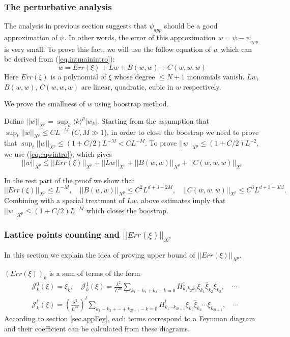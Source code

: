 \subsubsection{The perturbative analysis}\label{sec.pert intro} The analysis in previous section suggests that $\psi_{app}$ should be a good approximation of $\psi$. In other words, the error of this approximation $w=\psi-\psi_{app}$ is very small. To prove this fact, we will use the follow equation of $w$ which can be derived from (\ref{eq.intmainintro}):
\begin{equation}\label{eq.eqwintro}
    w= Err(\xi)+Lw+B(w,w)+C(w,w,w)
\end{equation}
Here $Err(\xi)$ is a polynomial of $\xi$ whose degree $\le N+1$ monomials vanish. $Lw$, $B(w,w)$, $C(w,w,w)$ are linear, quadratic, cubic in $w$ respectively.

We prove the smallness of $w$ using boostrap method.

Define $||w||_{X^p}=\sup_{k} \langle k\rangle^{p} |w_k|$. Starting from the assumption that $\sup_t||w||_{X^p}\le CL^{-M}$ ($C,M\gg 1$), in order to close the boostrap we need to prove that $\sup_t||w||_{X^p}\le (1+C/2)L^{-M}<CL^{-M}$. To prove $||w||_{X^p}\le (1+C/2)L^{-2}$, we use (\ref{eq.eqwintro}), which gives
\begin{equation}\label{eq.ineqw}
    ||w||_{X^p}\le ||Err(\xi)||_{X^p}+||Lw||_{X^p}+||B(w,w)||_{X^p}+||C(w,w,w)||_{X^p}
\end{equation}

In the rest part of the proof we show that 
\begin{equation}
    ||Err(\xi)||_{X^p}\le L^{-M},
    \quad ||B(w,w)||_{X^p}\le C^2L^{d+3-2M},
    \quad||C(w,w,w)||_{X^p}\le C^3L^{d+3-3M}.
\end{equation}
Combining with a special treatment of $Lw$, above estimates imply that $||w||_{X^p}\le (1+C/2)L^{-M}$ which closes the boostrap.


\subsubsection{Lattice points counting and $||Err(\xi)||_{X^p}$}\label{sec.latticeintro} In this section we explain the idea of proving upper bound of $||Err(\xi)||_{X^p}$.

$(Err(\xi))_{k}$ is a sum of terms of the form
\begin{equation}
\begin{split}
    &\mathcal{J}_k^0(\xi)=  \xi_k, \quad \mathcal{J}_k^1(\xi)=\frac{\lambda^2}{L^{2d}} \sum_{k_1-k_2+k_3-k=0} H^1_{k_1k_2k_3}  \xi_{k_1}\bar{\xi}_{k_2}\xi_{k_3} , \quad\cdots  \\
    &\mathcal{J}_k^l(\xi)=\left(\frac{\lambda^2}{L^{2d}}\right)^l\sum_{k_1-k_2+\cdots+k_{2l+1}-k=0} H^l_{k_1\cdots k_{2l+1}}  \xi_{k_1}\bar{\xi}_{k_2}\cdots\xi_{k_{2l+1}}, \quad\cdots 
\end{split}
\end{equation}
According to section \ref{sec.appFey}, each terms correspond to a Feynman diagram and their coefficient can be calculated from these diagrams. 

